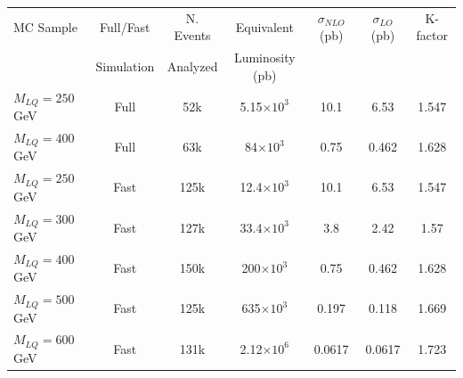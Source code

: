 \documentclass{cmspaper}
\begin{document}
\begin{linenumbers}
\begin{table}[htb]
  \label{tab:NumEvents}
  \begin{center}
    \begin{tabular}{|l|cccccc|} \hline\hline
      MC Sample                   & Full/Fast & N. Events & Equivalent             & $\sigma_{NLO}$ (pb) & $\sigma_{LO}$ (pb) & K-factor \\
                                  & Simulation& Analyzed  & Luminosity (pb)        &                     &                    &    \\ 
\hline\hline
      $M_{LQ}=250~$GeV            & Full      & 52k       &    5.15$\times 10^3$   & 10.1                & 6.53               & 1.547\\
      $M_{LQ}=400~$GeV            & Full      & 63k       &      84$\times 10^3$   &  0.75		 & 0.462	      & 1.628\\ 
\hline
      $M_{LQ}=250~$GeV            & Fast      & 125k      &    12.4$\times 10^3$   & 10.1		 & 6.53		      & 1.547\\
      $M_{LQ}=300~$GeV            & Fast      & 127k      &    33.4$\times 10^3$   &  3.8	         & 2.42		      & 1.57\\
      $M_{LQ}=400~$GeV            & Fast      & 150k      &     200$\times 10^3$   &  0.75	         & 0.462	      & 1.628\\
      $M_{LQ}=500~$GeV            & Fast      & 125k      &     635$\times 10^3$   &  0.197  	         & 0.118	      & 1.669\\
      $M_{LQ}=600~$GeV            & Fast      & 131k      &    2.12$\times 10^6$   &  0.0617             & 0.0617             & 1.723\\

\end{tabular}
\end{center}
\end{table}
\end{linenumbers}
\end{document}

